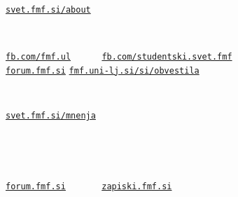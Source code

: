 \documentclass[a4paper,oneside,12pt]{article}
\title{\Title}
\author{\Author}
\date{\today}
\theoremstyle{definition}
\newcommand{\veliko}[1]{\scalebox{4}{#1}}
\newcommand{\povezava}[1]{\begin{center}\vspace{-20pt}\Large
  \href{http://#1}{\texttt{#1}}\end{center}}
\begin{document}
\veliko{Ali veš, kaj dela} \\[1ex]
\hspace*{\fill} \veliko{študentski svet?}

\povezava{svet.fmf.si/about}

\veliko{Ali želiš biti obveščen tem,} \\[1ex]
\hspace*{\fill} \veliko{kar se dogaja na faksu?}

\begin{center}
  \vspace{-20pt}
  \Large \href{http://fb.com/fmf.ul}{\texttt{fb.com/fmf.ul}}
  ~~~~~
  \Large \href{http://fb.com/studentski.svet.fmf}{\texttt{fb.com/studentski.svet.fmf}}
  ~~~~  \\
  \Large \href{http://forum.fmf.si}{\texttt{forum.fmf.si}} \hspace{36px}
  \Large \href{http://fmf.uni-lj.si/si/obvestila/}{\texttt{fmf.uni-lj.si/si/obvestila}}
  \hspace*{67px}
\end{center}

\veliko{Ali veš, kdo kandidira} \\[1ex]
\hspace*{\fill} \veliko{za izvolitev v naziv?}

\povezava{svet.fmf.si/mnenja}



\veliko{Ali veš, kdaj konvergira}\\[-6ex]
\begin{center}
\end{center}
\vspace{-5ex}
\veliko{in s katerega kolokvija} \\
\hspace*{\fill} \veliko{je ta naloga?}

\begin{center}\vspace{-20pt}\Large
  \href{http://forum.fmf.si}{\texttt{forum.fmf.si}} ~~~~~~
  \href{http://zapiski.fmf.si}{\texttt{zapiski.fmf.si}}
\end{center}

\end{document}
